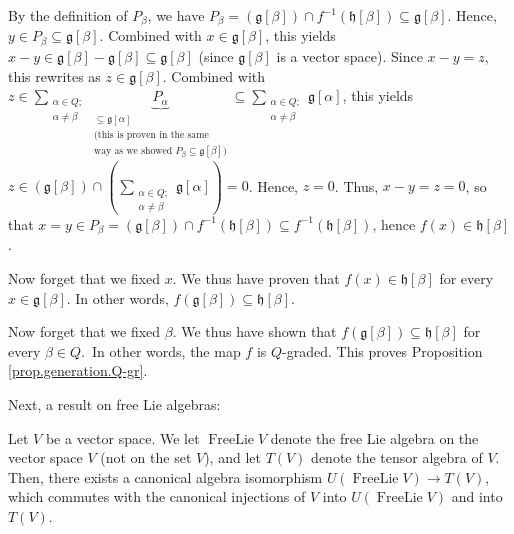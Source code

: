 \documentclass[etingof-lie.tex]{subfiles}
\begin{document}
\begin{verlong}
By the definition of $P_{\beta}$, we have $P_{\beta}=\left(  \mathfrak{g}%
\left[  \beta\right]  \right)  \cap f^{-1}\left(  \mathfrak{h}\left[
\beta\right]  \right)  \subseteq\mathfrak{g}\left[  \beta\right]  $. Hence,
$y\in P_{\beta}\subseteq\mathfrak{g}\left[  \beta\right]  $. Combined with
$x\in\mathfrak{g}\left[  \beta\right]  $, this yields $x-y\in\mathfrak{g}%
\left[  \beta\right]  -\mathfrak{g}\left[  \beta\right]  \subseteq
\mathfrak{g}\left[  \beta\right]  $ (since $\mathfrak{g}\left[  \beta\right]
$ is a vector space). Since $x-y=z$, this rewrites as $z\in\mathfrak{g}\left[
\beta\right]  $. Combined with $z\in\sum\limits_{\substack{\alpha\in
Q;\\\alpha\neq\beta}}\underbrace{P_{\alpha}}_{\substack{\subseteq
\mathfrak{g}\left[  \alpha\right]  \\\text{(this is proven in the
same}\\\text{way as we showed }P_{\beta}\subseteq\mathfrak{g}\left[
\beta\right]  \text{)}}}\subseteq\sum\limits_{\substack{\alpha\in
Q;\\\alpha\neq\beta}}\mathfrak{g}\left[  \alpha\right]  $, this yields
$z\in\left(  \mathfrak{g}\left[  \beta\right]  \right)  \cap\left(
\sum\limits_{\substack{\alpha\in Q;\\\alpha\neq\beta}}\mathfrak{g}\left[
\alpha\right]  \right)  =0$. Hence, $z=0$. Thus, $x-y=z=0$, so that $x=y\in
P_{\beta}=\left(  \mathfrak{g}\left[  \beta\right]  \right)  \cap
f^{-1}\left(  \mathfrak{h}\left[  \beta\right]  \right)  \subseteq
f^{-1}\left(  \mathfrak{h}\left[  \beta\right]  \right)  $, hence $f\left(
x\right)  \in\mathfrak{h}\left[  \beta\right]  $.

Now forget that we fixed $x$. We thus have proven that $f\left(  x\right)
\in\mathfrak{h}\left[  \beta\right]  $ for every $x\in\mathfrak{g}\left[
\beta\right]  $. In other words, $f\left(  \mathfrak{g}\left[  \beta\right]
\right)  \subseteq\mathfrak{h}\left[  \beta\right]  $.

Now forget that we fixed $\beta$. We thus have shown that $f\left(
\mathfrak{g}\left[  \beta\right]  \right)  \subseteq\mathfrak{h}\left[
\beta\right]  $ for every $\beta\in Q$.\ In other words, the map $f$ is
$Q$-graded. This proves Proposition \ref{prop.generation.Q-gr}.
\end{verlong}

Next, a result on free Lie algebras:

\begin{proposition}
\label{prop.Ufree}Let $V$ be a vector space. We let $\operatorname*{FreeLie}V$
denote the free Lie algebra on the vector space $V$ (not on the set $V$), and
let $T\left(  V\right)  $ denote the tensor algebra of $V$. Then, there exists
a canonical algebra isomorphism $U\left(  \operatorname*{FreeLie}V\right)
\rightarrow T\left(  V\right)  $, which commutes with the canonical injections
of $V$ into $U\left(  \operatorname*{FreeLie}V\right)  $ and into $T\left(
V\right)  $.
\end{proposition}
\end{document}
